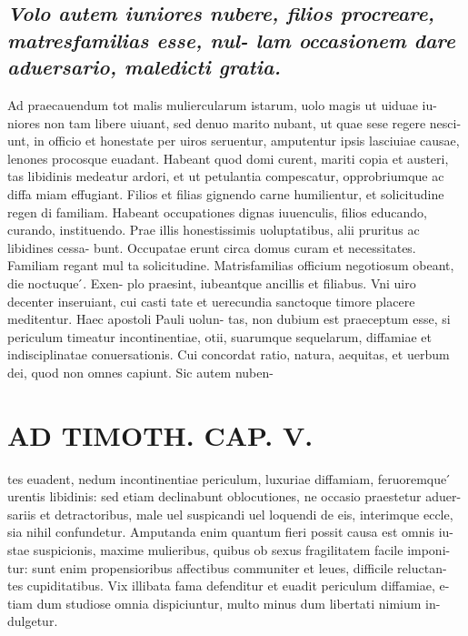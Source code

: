 \documentclass{article}
\begin{document}
\begin{pages}
\subsection*{\textit{Volo autem iuniores nubere, filios procreare, matresfamilias esse, nul- lam occasionem dare aduersario, maledicti gratia. }}\pstart Ad praecauendum tot malis muliercularum istarum, uolo magis ut uiduae iu- niores non tam libere uiuant, sed denuo marito nubant, ut quae sese regere nesci- unt, in officio et honestate per uiros seruentur, amputentur ipsis lasciuiae causae, lenones procosque euadant. Habeant quod domi curent, mariti copia et austeri, tas libidinis medeatur ardori, et ut petulantia compescatur, opprobriumque ac diffa miam effugiant. Filios et filias gignendo carne humilientur, et solicitudine regen di familiam. Habeant occupationes dignas iuuenculis, filios educando, curando, instituendo. Prae illis honestissimis uoluptatibus, alii pruritus ac libidines cessa- bunt. Occupatae erunt circa domus curam et necessitates. Familiam regant mul ta solicitudine. Matrisfamilias officium negotiosum obeant, die noctuque ́. Exen- plo praesint, iubeantque ancillis et filiabus. Vni uiro decenter inseruiant, cui casti tate et uerecundia sanctoque timore placere meditentur. Haec apostoli Pauli uolun- tas, non dubium est praeceptum esse, si periculum timeatur incontinentiae, otii, suarumque sequelarum, diffamiae et indisciplinatae conuersationis. Cui concordat ratio, natura, aequitas, et uerbum dei, quod non omnes capiunt. Sic autem nuben-  \pend
\section*{AD TIMOTH. CAP. V. }
\marginpar{[ p.521 ]}\pstart tes euadent, nedum incontinentiae periculum, luxuriae diffamiam, feruoremque ́ urentis libidinis: sed etiam declinabunt oblocutiones, ne occasio praestetur aduer- sariis et detractoribus, male uel suspicandi uel loquendi de eis, interimque eccle, sia nihil confundetur. Amputanda enim quantum fieri possit causa est omnis iu- stae suspicionis, maxime mulieribus, quibus ob sexus fragilitatem facile imponi- tur: sunt enim propensioribus affectibus communiter et leues, difficile reluctan- tes cupiditatibus. Vix illibata fama defenditur et euadit periculum diffamiae, e- tiam dum studiose omnia dispiciuntur, multo minus dum libertati nimium in- dulgetur.  \pend
{}
{}

\end{pages}
\end{document}
